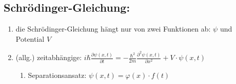\subsection{Schrödinger-Gleichung:}\label{schroedinger}
\begin{enumerate}
    \item die Schrödinger-Gleichung hängt nur von zwei Funktionen ab: $\psi$ und Potential $V$
    \item (allg.) zeitabhängige: $i\hbar\frac{\partial\psi\left(x,t\right)}{\partial t}=-\frac{\hbar^{2}}{2m}\frac{\partial^{2}\psi\left(x,t\right)}{\partial x^{2}}+V\cdot\psi\left(x,t\right)$
    \begin{enumerate}
        \item Separationsansatz: $\psi(x,t)=\varphi(x)\cdot f(t)$
    \end{enumerate}



\end{enumerate}
